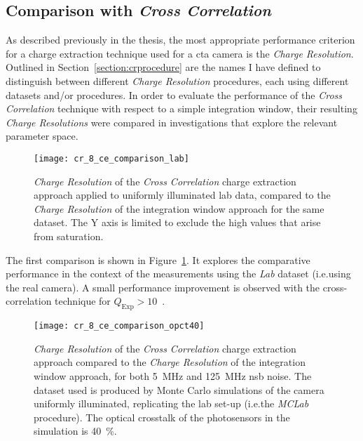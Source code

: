 \subsection{Comparison with \textit{Cross Correlation}}

As described previously in the thesis, the most appropriate performance criterion for a charge extraction technique used for a \gls{cta} camera is the \textit{Charge Resolution}. Outlined in Section~\ref{section:crprocedure} are the names I have defined to distinguish between different \textit{Charge Resolution} procedures, each using different datasets and/or procedures. In order to evaluate the performance of the \textit{Cross Correlation} technique with respect to a simple integration window, their resulting \textit{Charge Resolutions} were compared in investigations that explore the relevant parameter space.

\begin{figure}
  \texttt{[image: cr\_8\_ce\_comparison\_lab]}
  \caption[\textit{Charge Resolution} comparison between \textit{Cross Correlation} and \textit{Window Integration} for \textit{Lab} data.]{\textit{Charge Resolution} of the \textit{Cross Correlation} charge extraction approach applied to uniformly illuminated lab data, compared to the \textit{Charge Resolution} of the integration window approach for the same dataset. The Y axis is limited to exclude the high values that arise from saturation.}
  \label{fig:cr_8_ce_comparison_lab}
\end{figure}

The first comparison is shown in Figure~\ref{fig:cr_8_ce_comparison_lab}. It explores the comparative performance in the context of the measurements using the \textit{Lab} dataset (i.e.\@ using the real camera). A small performance improvement is observed with the cross-correlation technique for $Q_\text{Exp} > 10$~\si{\pe}.

\begin{figure}
  \texttt{[image: cr\_8\_ce\_comparison\_opct40]}
  \caption[\textit{Charge Resolution} comparison between \textit{Cross Correlation} and \textit{Window Integration} for \textit{MCLab} data with an optical crosstalk of \SI{40}{\percent}.]{\textit{Charge Resolution} of the \textit{Cross Correlation} charge extraction approach compared to the \textit{Charge Resolution} of the integration window approach, for both \SI{5}{MHz} and \SI{125}{MHz} \gls{nsb} noise. The dataset used is produced by Monte Carlo simulations of the camera uniformly illuminated, replicating the lab set-up (i.e.\@ the \textit{MCLab} procedure). The optical crosstalk of the photosensors in the simulation is \SI{40}{\percent}.}
  \label{fig:cr_8_ce_comparison_opct40}
\end{figure}

